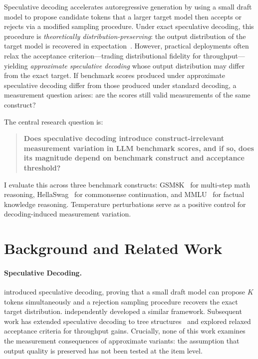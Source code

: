 \documentclass{article}
\begin{document}
Speculative decoding accelerates autoregressive generation by using a small draft model to propose candidate tokens that a larger target model then accepts or rejects via a modified sampling procedure. Under exact speculative decoding, this procedure is \emph{theoretically distribution-preserving}: the output distribution of the target model is recovered in expectation~\citep{leviathan2023fast, chen2023accelerating}. However, practical deployments often relax the acceptance criterion---trading distributional fidelity for throughput---yielding \emph{approximate speculative decoding} whose output distribution may differ from the exact target. If benchmark scores produced under approximate speculative decoding differ from those produced under standard decoding, a measurement question arises: are the scores still valid measurements of the same construct?

The central research question is:

\begin{quote}
\textbf{Does speculative decoding introduce construct-irrelevant measurement variation in LLM benchmark scores, and if so, does its magnitude depend on benchmark construct and acceptance threshold?}
\end{quote}

I evaluate this across three benchmark constructs: GSM8K~\citep{cobbe2021gsm8k} for multi-step math reasoning, HellaSwag~\citep{zellers2019hellaswag} for commonsense continuation, and MMLU~\citep{hendrycks2021mmlu} for factual knowledge reasoning. Temperature perturbations serve as a positive control for decoding-induced measurement variation.

\section{Background and Related Work}

\paragraph{Speculative Decoding.}
\citet{leviathan2023fast} introduced speculative decoding, proving that a small draft model can propose $K$ tokens simultaneously and a rejection sampling procedure recovers the exact target distribution. \citet{chen2023accelerating} independently developed a similar framework. Subsequent work has extended speculative decoding to tree structures~\citep{miao2024specinfer} and explored relaxed acceptance criteria for throughput gains. Crucially, none of this work examines the measurement consequences of approximate variants: the assumption that output quality is preserved has not been tested at the item level.
\end{document}
